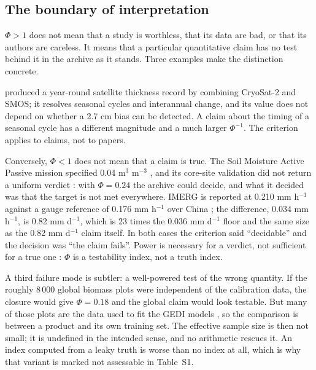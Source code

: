 \documentclass[preprint,12pt,authoryear]{elsarticle}
\begin{document}
\subsection{The boundary of interpretation}
\label{sec:boundary}

$\Phi > 1$ does not mean that a study is worthless, that its data are bad, or that its authors are careless. It means that a particular quantitative claim has no test behind it in the archive as it stands. Three examples make the distinction concrete.

\citet{landy2022year} produced a year-round satellite thickness record by combining CryoSat-2 and SMOS; it resolves seasonal cycles and interannual change, and its value does not depend on whether a 2.7 cm bias can be detected. A claim about the timing of a seasonal cycle has a different magnitude and a much larger $\Phi^{-1}$. The criterion applies to claims, not to papers.

Conversely, $\Phi < 1$ does not mean that a claim is true. The Soil Moisture Active Passive mission specified 0.04 m$^3$ m$^{-3}$ \citep{entekhabi2010soil}, and its core-site validation did not return a uniform verdict \citep{colliander2017validation}: with $\Phi = 0.24$ the archive could decide, and what it decided was that the target is not met everywhere. IMERG is reported at 0.210 mm h$^{-1}$ against a gauge reference of 0.176 mm h$^{-1}$ over China \citep{li2018evaluation}; the difference, 0.034 mm h$^{-1}$, is 0.82 mm d$^{-1}$, which is 23 times the 0.036 mm d$^{-1}$ floor and the same size as the 0.82 mm d$^{-1}$ claim itself. In both cases the criterion said ``decidable'' and the decision was ``the claim fails''. Power is necessary for a verdict, not sufficient for a true one \citep{altman1995absence,greenland2016statistical}: $\Phi$ is a testability index, not a truth index.

A third failure mode is subtler: a well-powered test of the wrong quantity. If the roughly 8\,000 global biomass plots were independent of the calibration data, the closure would give $\Phi = 0.18$ and the global claim would look testable. But many of those plots are the data used to fit the GEDI models \citep{duncanson2022aboveground}, so the comparison is between a product and its own training set. The effective sample size is then not small; it is undefined in the intended sense, and no arithmetic rescues it. An index computed from a leaky truth is worse than no index at all, which is why that variant is marked not assessable in Table~S1.
\end{document}
